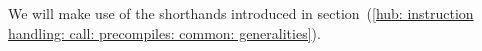 We will make use of the shorthands introduced in
section~(\ref{hub: instruction handling: call: precompiles: common: generalities}).
